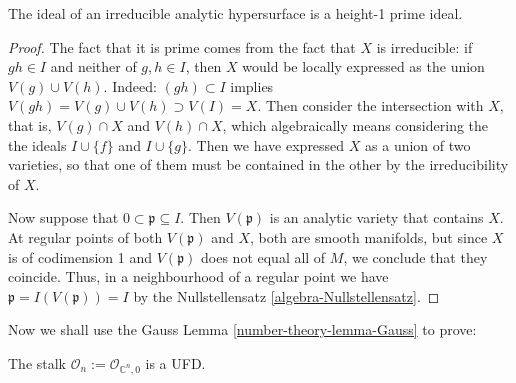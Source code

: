 \begin{lemma}
\label{lemma-ideal-of-irreducible-hypersurface-is-height-1-prime}
The ideal of an irreducible analytic hypersurface is a height-1 prime ideal.
\end{lemma}

\begin{proof} 
The fact that it is prime comes from the fact that $X$ is
irreducible: if $gh \in I$ and neither of $g,h \in I$, then $X$ would be locally
expressed as the union $V(g) \cup  V(h)$. Indeed: $(gh) \subset I$ implies
$V(gh)=V(g)\cup V(h) \supset V(I)=X$. Then consider the intersection with $X$,
that is, $V(g)\cap X$ and $V(h)\cap X$, 
which algebraically means considering the
the ideals $I \cup \{f\}$ and $I \cup \{g\}$. Then we have expressed $X$ as 
a union of two varieties, so that one of them must be contained in the other by
the irreducibility of $X$.

Now suppose that $0 \subset \mathfrak{p} \subseteq I$.
Then $V(\mathfrak{p})$ is an analytic variety that contains $X$.
At regular points of both $V(\mathfrak{p})$ and $X$, 
both are smooth manifolds, but since $X$ is of codimension 1 and 
$V(\mathfrak{p})$ does not equal all of  $M$, 
we conclude that they coincide. 
Thus, in a neighbourhood
of a regular point we have $\mathfrak{p}=I(V(\mathfrak{p}))=I$ by the
Nullstellensatz \ref{algebra-Nullstellensatz}.
\end{proof}

Now we shall use the Gauss Lemma 
\ref{number-theory-lemma-Gauss} to prove:

\begin{lemma}
\label{lemma-stalk-is-UFD}
The stalk $\mathcal{O}_n:=\mathcal{O}_{\mathbb{C}^n,0}$ is a UFD.
\end{lemma}

